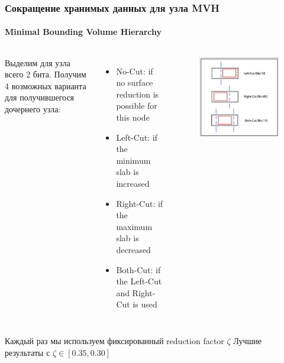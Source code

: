 \documentclass{beamer}
\begin{document}
\begin{frame}[t]
    \frametitle{Сокращение хранимых данных для узла MVH}
    \framesubtitle{Minimal Bounding Volume Hierarchy}
    \begin{columns}
        Выделим для узла всего 2 бита. Получим 4 возможных варианта для получившегося дочернего узла:
        \begin{itemize}
            \item
                No-Cut: if no surface reduction is possible for this node
            \item
                Left-Cut: if the minimum slab is increased
            \item
                Right-Cut: if the maximum slab is decreased
            \item
                Both-Cut: if the Left-Cut and Right-Cut is used
        \end{itemize}
        \begin{figure}
            \includegraphics[keepaspectratio, width=\textwidth]{res/splitting_mvh.png}
        \end{figure}
    \end{columns}
    \begin{block}{}
        Каждый раз мы используем фиксированный reduction factor $\zeta$
        Лучшие результаты с $\zeta \in [ 0.35, 0.30]$
    \end{block}

\end{frame}
\end{document}
